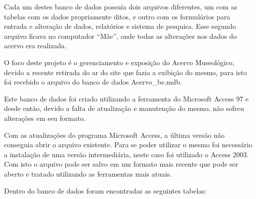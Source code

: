 \documentclass[a4paper,12pt,oneside,onecolumn,final,fleqn]{repUERJ}
\begin{document}
Cada um destes banco de dados possuía dois arquivos diferentes, um com as tabelas com os dados propriamente ditos, e outro com os formulários para entrada e alteração de dados, relatórios e sistema de pesquisa. Esse segundo arquivo ficava no computador ``Mãe'', onde todas as alterações nos dados do acervo era realizada.

O foco deste projeto é o gerenciamento e exposição do Acervo Museológico, devido a recente retirada do ar do site que fazia a exibição do mesmo, para isto foi recebido o arquivo do banco de dados Acervo\_be.mdb.

Este banco de dados foi criado utilizando a ferramenta do Microsoft Access 97 e desde então, devido a falta de atualização e manutenção do mesmo, não sofreu alterações em seu formato.

Com as atualizações do programa Microsoft Access, a última versão não conseguia abrir o arquivo existente. Para se poder utilizar o mesmo foi necessário a instalação de uma versão intermediária, neste caso foi utilizado o Access 2003. Com isto o arquivo pode ser salvo em um formato mais recente que pode ser aberto e tratado utilizando as ferramentas mais atuais.

Dentro do banco de dados foram encontradas as seguintes tabelas:
\end{document}
